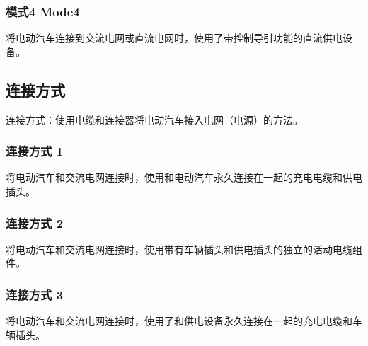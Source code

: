 		\subsubsection*{模式4 Mode4}
			将电动汽车连接到交流电网或直流电网时，使用了带控制导引功能的直流供电设备。 

	\subsection{连接方式}
		连接方式：使用电缆和连接器将电动汽车接入电网（电源）的方法。
		\subsubsection*{连接方式 1}
			将电动汽车和交流电网连接时，使用和电动汽车永久连接在一起的充电电缆和供电插头。
		\subsubsection*{连接方式 2}
			将电动汽车和交流电网连接时，使用带有车辆插头和供电插头的独立的活动电缆组件。
		\subsubsection*{连接方式 3}
			将电动汽车和交流电网连接时，使用了和供电设备永久连接在一起的充电电缆和车辆插头。








